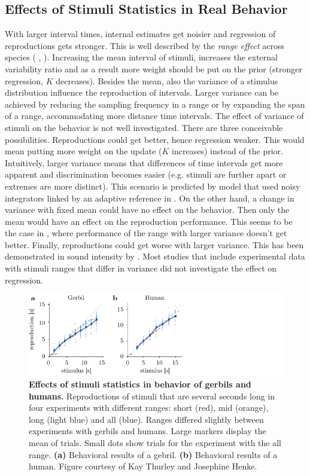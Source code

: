 \documentclass[10pt]{article}
\begin{document}
\subsection{Effects of Stimuli Statistics in Real Behavior}
With larger interval times, internal estimates get noisier and regression of reproductions gets stronger. This is well described by the \textit{range effect} across species (\cite{Cicchini2012} \cite{Sohn2019}, \cite{Henke2021}). 
Increasing the mean interval of stimuli, increases the external variability ratio
and as a result more weight should be put on the prior (stronger regression, $K$ decreases).
Besides the mean, also the variance of a stimulus distribution influence the reproduction of intervals.
Larger variance can be achieved by reducing the sampling frequency in a range or by expanding the span of a range, accommodating more distance time intervals. 
The effect of variance of stimuli on the behavior is not well investigated.
There are three conceivable possibilities. 
Reproductions could get better, hence regression weaker. This would mean putting more weight on the update ($K$ increases) instead of the prior. 
Intuitively, larger variance means that differences of time intervals get more apparent and discrimination becomes easier (e.g. stimuli are further apart or extremes are more distinct). 
This scenario is predicted by model that used noisy integrators linked by an adaptive reference in \cite{Thurley2016}.
On the other hand, a change in variance with fixed mean could have no effect on the behavior. Then only the mean would have an effect on the reproduction performance.
This seems to be the case in \cite{Petzschner2012}, where performance of the range with larger variance doesn't get better. 
Finally, reproductions could get worse with larger variance. This has been demonstrated in sound intensity by \cite{Teghtsoonian78}.
Most studies that include experimental data with stimuli ranges that differ in variance did not investigate the effect on regression. 

\begin{figure}[ht]
	\centering
	\includegraphics{figures/underestimation.pdf}
	\caption{\textbf{Effects of stimuli statistics in behavior of gerbils and humans.}
	Reproductions of stimuli that are several seconds long in four experiments with different ranges: short (red), mid (orange), long (light blue) and all (blue). Ranges differed slightly between experiments with gerbils and humans. 
	Large markers display the mean of trials.  Small dots show trials for the experiment with the all range.
	\textbf{(a)} Behavioral results of a gebril.
	\textbf{(b)} Behavioral results of a human.
	Figure courtesy of Kay Thurley and Josephine Henke.
	}
\label{fig:underestimation}
\end{figure}
\end{document}
